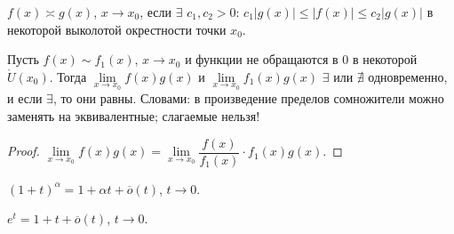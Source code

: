 \documentclass[12pt]{article}
\begin{document}
	\begin{definition}
		$f(x) \asymp g(x)$, $x \rightarrow x_0$, если $\exists$ $c_1, c_2 > 0$: $c_1|g(x)| \leqslant |f(x)| \leqslant c_2|g(x)|$ в некоторой выколотой окрестности точки $x_0$.
	\end{definition}
	\begin{theorem}
		Пусть $f(x) \sim f_1(x)$, $x \rightarrow x_0$ и функции не обращаются в $0$ в некоторой $\mathring{U}(x_0)$. Тогда $\lim\limits_{x \rightarrow x_0} f(x)g(x)$ и $\lim\limits_{x \rightarrow x_0} f_1(x)g(x)$ $\exists$ или $\nexists$ одновременно, и если $\exists$, то они равны. Словами: в произведение пределов сомножители можно заменять на эквивалентные; слагаемые нельзя!
	\end{theorem}
	\begin{proof}
		$\lim\limits_{x \rightarrow x_0} f(x)g(x) = \lim\limits_{x \rightarrow x_0} \dfrac{f(x)}{f_1(x)} \cdot f_1(x)g(x)$.
	\end{proof}
	\begin{statement}
		$(1 + t)^\alpha = 1 + \alpha t + \overline{o}(t)$, $t \rightarrow 0$.
	\end{statement}
	\begin{statement}
		$e^t = 1 + t + \overline{o}(t)$, $t \rightarrow 0$.
	\end{statement}
\end{document}
